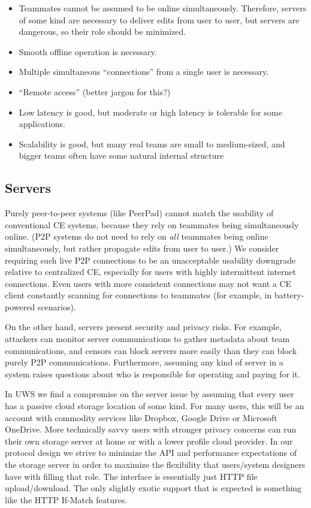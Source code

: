 \documentclass{article}
\begin{document}
\begin{itemize}
\item Teammates cannot be assumed to be online simultaneously.
  Therefore, servers of some kind are necessary to deliver edits from user to user, but servers are dangerous, so their role should be minimized.
\item Smooth offline operation is necessary.
\item Multiple simultaneous ``connections'' from a single user is necessary.
\item ``Remote access'' (better jargon for this?)
\item Low latency is good, but moderate or high latency is tolerable for some applications.
\item Scalability is good, but many real teams are small to medium-sized, and bigger teams often have some natural internal structure
\end{itemize}

\subsection{Servers}

Purely peer-to-peer systems (like PeerPad) cannot match the usability of conventional CE systems, because they rely on teammates being simultaneously online.
(P2P systems do not need to rely on \emph{all} teammates being online simultaneously, but rather propagate edits from user to user.)
We consider requiring such live P2P connections to be an unacceptable usability downgrade relative to centralized CE, especially for users with highly intermittent internet connections.
Even users with more consistent connections may not want a CE client constantly scanning for connections to teammates (for example, in battery-powered scenarios).

On the other hand, servers present security and privacy risks.
For example, attackers can monitor server communications to gather metadata about team communications, and censors can block servers more easily than they can block purely P2P communications.
Furthermore, assuming any kind of server in a system raises questions about who is responsible for operating and paying for it.

In UWS we find a compromise on the server issue by assuming that every user has a passive cloud storage location of some kind.
For many users, this will be an account with commodity services like Dropbox, Google Drive or Microsoft OneDrive.
More technically savvy users with stronger privacy concerns can run their own storage server at home or with a lower profile cloud provider.
In our protocol design we strive to minimize the API and performance expectations of the storage server in order to maximize the flexibility that users/system designers have with filling that role.
The interface is essentially just HTTP file upload/download.
The only slightly exotic support that is expected is something like the HTTP If-Match features.
\end{document}
